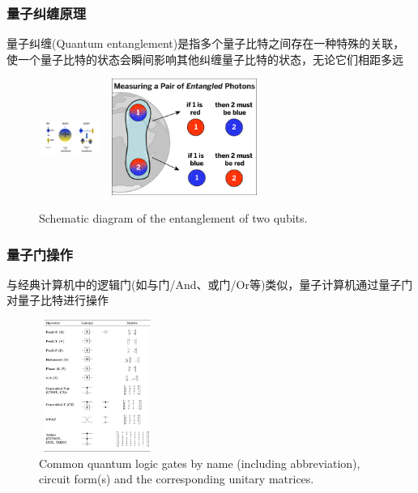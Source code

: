 \begin{frame}
    \frametitle{量子纠缠原理}
    量子纠缠\textrm{(Quantum entanglement)}是指多个量子比特之间存在一种特殊的关联，使一个量子比特的状态会瞬间影响其他纠缠量子比特的状态，无论它们相距多远
            \begin{figure}
        \centering
                \includegraphics[height=1.5in, width=0.8in, viewport=460 0 645 380,clip]{Figures/Illustration-of-a-bit_and_qubit.png}
                \includegraphics[height=1.5in, width=2.05in, viewport=0 0 980 775,clip]{Figures/Quantum_Entanglement_chart.png}
		\caption{\tiny{\textrm{Schematic diagram of the entanglement of two qubits.}}}
		\label{Fig:Illustration-of-a-qubit-entanglement}
            \end{figure}
	    \vskip -10pt
	    {\fontsize{7.5pt}{5.2pt}\selectfont{利用量子纠缠可以实现高效的信息传输和处理，是量子通信和量子计算的重要资源}}
\end{frame}

\begin{frame}
    \frametitle{量子门操作}
    与经典计算机中的逻辑门\textrm{(如与门/And、或门/Or等)}类似，量子计算机通过量子门对量子比特进行操作\\
{\fontsize{7.5pt}{5.2pt}}
    \begin{figure}
        \centering
                \includegraphics[height=1.7in, width=1.5in, viewport=0 0 390 430,clip]{Figures/Quantum_Logic_Gates.png}
		\caption{\tiny{\textrm{Common quantum logic gates by name (including abbreviation), circuit form(s) and the corresponding unitary matrices.}}}
		\label{Fig:Quantum_Logic_Gates}
    \end{figure}
\end{frame}

